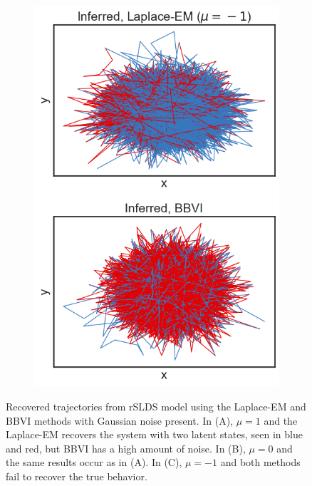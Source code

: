 \begin{figure}
\begin{subfigure}[b]{0.33\linewidth}
        \includegraphics[width=\linewidth]{./Figures/vdp-bad-mu-1.png}
        \caption{}
        \label{badvdp:c}
        \vspace{4ex}
    \end{subfigure}
    \caption{Recovered trajectories from rSLDS model using the Laplace-EM and BBVI methods with Gaussian noise present. In (A), $\mu = 1$ and the Laplace-EM recovers the system with two latent states, seen in blue and red, but BBVI has a high amount of noise. In (B), $\mu = 0$ and the same results occur as in (A). In (C), $\mu = -1$ and both methods fail to recover the true behavior.}
    \label{badvdp}
\end{figure}

